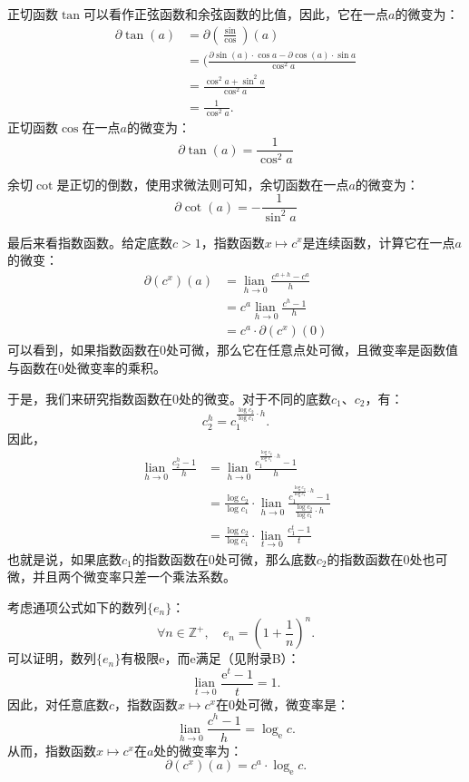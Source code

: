 \documentclass[12pt,UTF8]{ctexbook}
\newcommand{\lian}[1]{
    \underset{#1}{\operatorname{lian}\,}
}
\theoremstyle{definition}
\theoremstyle{plain}
\begin{document}
正切函数$\tan$可以看作正弦函数和余弦函数的比值，因此，它在一点$a$的微变为：
\begin{align*}
    \partial \tan(a) &= \partial \left(\frac{\sin}{\cos}\right)(a)  \\
    &= (\frac{\partial \sin(a) \cdot \cos{a} - \partial \cos(a) \cdot \sin{a}}{\cos^2{a}}  \\
    &= \frac{\cos^2{a} + \sin^2{a}}{\cos^2{a}}  \\
    &= \frac{1}{\cos^2{a}}.  
\end{align*}
正切函数$\cos$在一点$a$的微变为：
$$ \partial \tan(a) = \frac{1}{\cos^2{a}} $$

余切$\cot$是正切的倒数，使用求微法则可知，余切函数在一点$a$的微变为：
$$ \partial \cot(a) = -\frac{1}{\sin^2{a}} $$

最后来看指数函数。给定底数$c > 1$，指数函数$x\mapsto c^x$是连续函数，计算它在一点$a$的微变：
\begin{align*}
    \partial (c^x) (a) &= \lian{h\to 0} \frac{c^{a+h} - c^a}{h}  \\
    &= c^a \lian{h\to 0} \frac{c^h - 1}{h}  \\
    &= c^a \cdot \partial (c^x) (0) 
\end{align*}
可以看到，如果指数函数在$0$处可微，那么它在任意点处可微，且微变率是函数值与函数在$0$处微变率的乘积。

于是，我们来研究指数函数在$0$处的微变。对于不同的底数$c_1$、$c_2$，有：
$$c_2^h = c_1^{\frac{\log{c_2}}{\log{c_1}}\cdot h}.$$
因此，
\begin{align*}
    \lian{h\to 0} \frac{c_2^h - 1}{h} &= \lian{h\to 0} \frac{c_1^{\frac{\log{c_2}}{\log{c_1}}\cdot h} - 1}{h}  \\
    &= \frac{\log{c_2}}{\log{c_1}} \cdot \lian{h\to 0} \frac{c_1^{\frac{\log{c_2}}{\log{c_1}}\cdot h} - 1}{\frac{\log{c_2}}{\log{c_1}} \cdot h}  \\
    &= \frac{\log{c_2}}{\log{c_1}} \cdot \lian{t\to 0} \frac{c_1^{t} - 1}{t}  
\end{align*}
也就是说，如果底数$c_1$的指数函数在$0$处可微，那么底数$c_2$的指数函数在$0$处也可微，并且两个微变率只差一个乘法系数。

考虑通项公式如下的数列$\{e_n\}$：
$$ \forall n\in\mathbb{Z}^+,\quad e_n = \left(1 + \frac{1}{n}\right)^n.$$
可以证明，数列$\{e_n\}$有极限$\mathrm{e}$，而$\mathrm{e}$满足（见附录B）：
$$ \lian{t\to 0} \frac{\mathrm{e}^{t} - 1}{t} = 1.$$
因此，对任意底数$c$，指数函数$x\mapsto c^x$在$0$处可微，微变率是：
$$ \lian{h\to 0} \frac{c^h - 1}{h} = \log_{\mathrm{e}}{c}.$$
从而，指数函数$x\mapsto c^x$在$a$处的微变率为：
$$ \partial (c^x) (a) = c^a \cdot \log_{\mathrm{e}}{c}. $$
\end{document}
